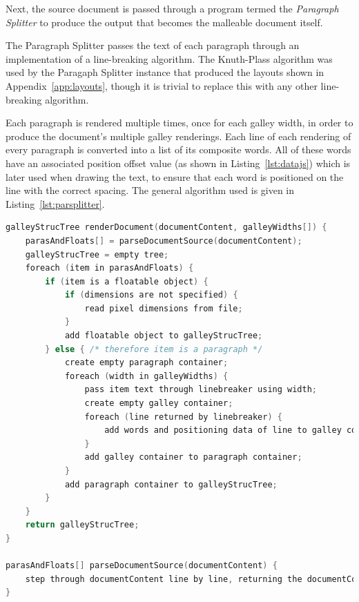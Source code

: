 Next, the source document is passed through a program termed the \emph{Paragraph Splitter} to produce the output that becomes the malleable document itself.

The Paragraph Splitter passes the text of each paragraph through an implementation of a line-breaking algorithm. The Knuth-Plass algorithm\hspace{0pt}\cite{Knuth1981} was used by the Paragaph Splitter instance that produced the layouts shown in Appendix~\ref{app:layouts}, though it is trivial to replace this with any other line-breaking algorithm.

Each paragraph is rendered multiple times, once for each galley width, in order to produce the document's multiple galley renderings. Each line of each rendering of every paragraph is converted into a list of its composite words. All of these words have an associated position offset value (as shown in Listing~\ref{lst:datajs}) which is later used when drawing the text, to ensure that each word is positioned on the line with the correct spacing. The general algorithm used is given in Listing~\ref{lst:parsplitter}.


\begin{lstlisting}[label=lst:parsplitter,language=c,captionpos=b,float,basicstyle=\ttfamily\footnotesize,caption={[Algorithm used by the Paragraph Splitter]The algorithm followed by the Paragraph Splitter. Firstly the source of the document is parsed to break it into its initial logical blocks: one block per paragraph and one block per float, in the order encountered in the document source. These blocks are then processed further depending on their type. Floats may be probed for their pixel dimensions if no size was specified, and are then added to the Galley Structure Tree. Paragraphs have their content passed through a line breaking algorithm, once for each specified width.}]
galleyStrucTree renderDocument(documentContent, galleyWidths[]) {
    parasAndFloats[] = parseDocumentSource(documentContent);
    galleyStrucTree = empty tree;
    foreach (item in parasAndFloats) {
        if (item is a floatable object) {
            if (dimensions are not specified) {
                read pixel dimensions from file;
            }
            add floatable object to galleyStrucTree;
        } else { /* therefore item is a paragraph */
            create empty paragraph container;
            foreach (width in galleyWidths) {
                pass item text through linebreaker using width;
                create empty galley container;
                foreach (line returned by linebreaker) {
                    add words and positioning data of line to galley container;
                }
                add galley container to paragraph container;
            }
            add paragraph container to galleyStrucTree;
        }
    }
    return galleyStrucTree;
}

parasAndFloats[] parseDocumentSource(documentContent) {
    step through documentContent line by line, returning the documentContent broken into an array of strings with one element per paragraph and per floatable object;
}

\end{lstlisting}


